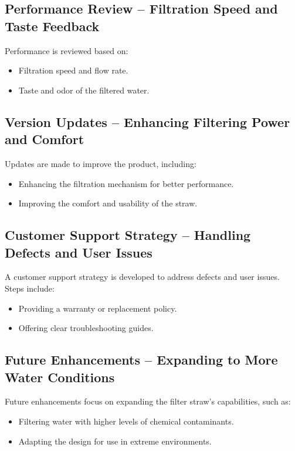 \documentclass{article}
\begin{document}
\vspace{0.5cm}

\subsection{Performance Review – Filtration Speed and Taste Feedback}
Performance is reviewed based on:
\begin{itemize}
    \item Filtration speed and flow rate.
    \item Taste and odor of the filtered water.
\end{itemize}

\vspace{0.5cm}

\subsection{Version Updates – Enhancing Filtering Power and Comfort}
Updates are made to improve the product, including:
\begin{itemize}
    \item Enhancing the filtration mechanism for better performance.
    \item Improving the comfort and usability of the straw.
\end{itemize}

\vspace{0.5cm}

\subsection{Customer Support Strategy – Handling Defects and User Issues}
A customer support strategy is developed to address defects and user issues. Steps include:
\begin{itemize}
    \item Providing a warranty or replacement policy.
    \item Offering clear troubleshooting guides.
\end{itemize}

\vspace{0.5cm}

\subsection{Future Enhancements – Expanding to More Water Conditions}
Future enhancements focus on expanding the filter straw's capabilities, such as:
\begin{itemize}
    \item Filtering water with higher levels of chemical contaminants.
    \item Adapting the design for use in extreme environments.
\end{itemize}
\end{document}
